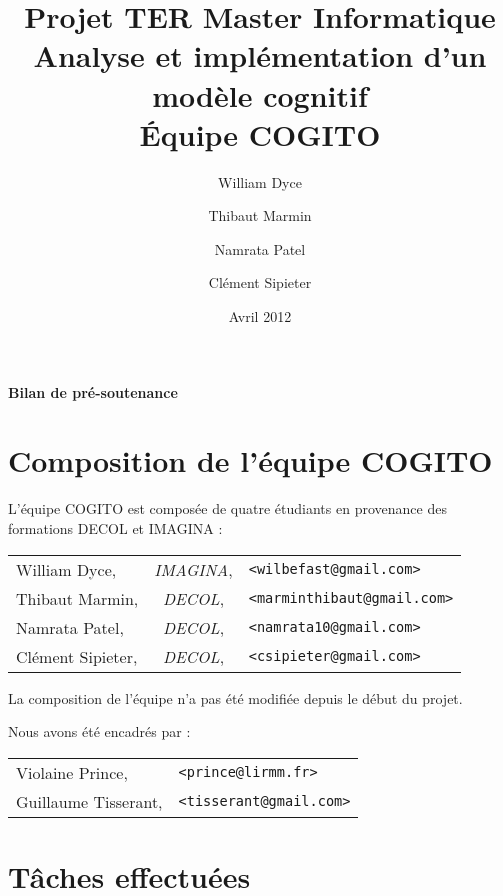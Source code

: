 \documentclass[a4paper,french,10pt]{article}
\title{\textbf{Projet TER Master Informatique \\ Analyse et implémentation d'un modèle cognitif} \\ Équipe COGITO}
\author{William Dyce \and Thibaut Marmin \and Namrata Patel \and Clément Sipieter}
\date{Avril 2012}
\begin{document}
\maketitle

\textbf{\LARGE Bilan de pré-soutenance}
\section{Composition de l'équipe COGITO}
L'équipe COGITO est composée de quatre étudiants en provenance des formations DECOL et IMAGINA :
\begin{center}
	\begin{tabular}{l c l}
	William Dyce, &\textit{IMAGINA}, &\texttt{<wilbefast@gmail.com>} \\
	Thibaut Marmin, &\textit{DECOL}, &\texttt{<marminthibaut@gmail.com>} \\
	Namrata Patel, &\textit{DECOL}, &\texttt{<namrata10@gmail.com>} \\
	Clément Sipieter, &\textit{DECOL}, &\texttt{<csipieter@gmail.com>} \\
	\end{tabular}
\end{center}

La composition de l'équipe n'a pas été modifiée depuis le début du projet.

Nous avons été encadrés par :
\begin{center}
	\begin{tabular}{l l}
	Violaine Prince, &\texttt{<prince@lirmm.fr>} \\
	Guillaume Tisserant, &\texttt{<tisserant@gmail.com>} \\
	\end{tabular}
\end{center}
\section{Tâches effectuées}
\end{document}

